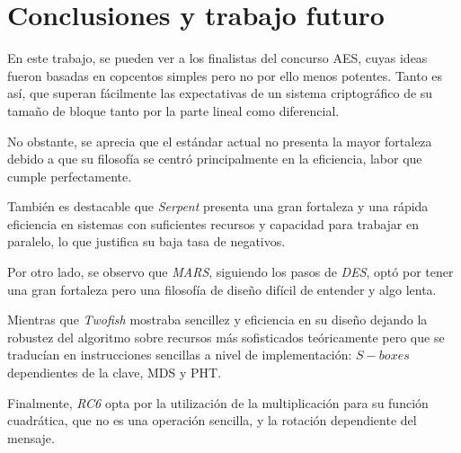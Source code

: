 \chapter{Conclusiones y trabajo futuro}
\label{chp:conclusion}
En este trabajo, se pueden ver a los finalistas del concurso AES, cuyas ideas fueron basadas en copcentos simples pero no por ello menos potentes. Tanto es así, que superan fácilmente las expectativas de un sistema criptográfico de su tamaño de bloque tanto por la parte lineal como diferencial.

No obstante, se aprecia que el estándar actual no presenta la mayor fortaleza debido a que su filosofía se centró principalmente en la eficiencia, labor que cumple perfectamente.

También es destacable que \textit{Serpent} presenta una gran fortaleza y una rápida eficiencia en sistemas con suficientes recursos y capacidad para trabajar en paralelo, lo que justifica su baja tasa de negativos.

Por otro lado, se observo que \textit{MARS}, siguiendo los pasos de \textit{DES}, optó por tener una gran fortaleza pero una filosofía de diseño difícil de entender y algo lenta.

Mientras que \textit{Twofish} mostraba sencillez y eficiencia en su diseño dejando la robustez del algoritmo sobre recursos más sofisticados teóricamente pero que se traducían en instrucciones sencillas a nivel de implementación: $S-boxes$ dependientes de la clave, MDS y PHT.

Finalmente, \textit{RC6} opta por la utilización de la multiplicación para su función cuadrática, que no es una operación sencilla, y la rotación dependiente del mensaje.

